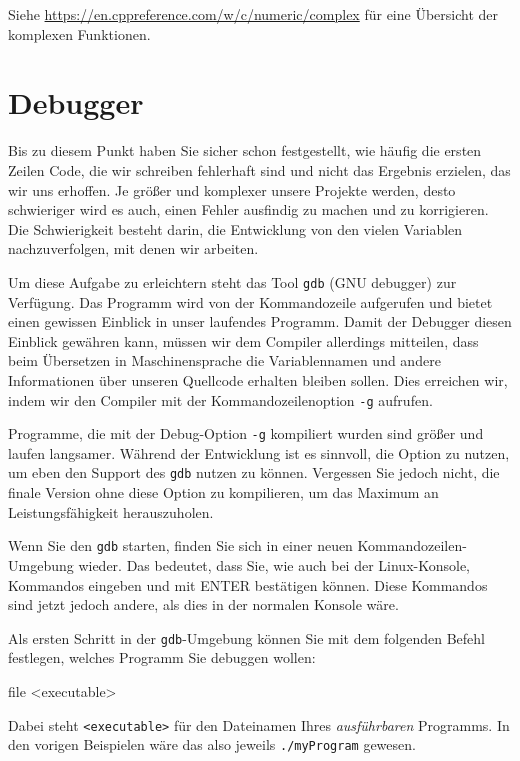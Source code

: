Siehe \url{https://en.cppreference.com/w/c/numeric/complex} für eine Übersicht der komplexen Funktionen.

\section{Debugger}
Bis zu diesem Punkt haben Sie sicher schon festgestellt, wie häufig die ersten Zeilen Code, die wir schreiben fehlerhaft sind und nicht das Ergebnis erzielen, das wir uns erhoffen. Je größer und komplexer unsere Projekte werden, desto schwieriger wird es auch, einen Fehler ausfindig zu machen und zu korrigieren. Die Schwierigkeit besteht darin, die Entwicklung von den vielen Variablen nachzuverfolgen, mit denen wir arbeiten.

Um diese Aufgabe zu erleichtern steht das Tool \texttt{gdb} (GNU debugger) zur Verfügung. Das Programm wird von der Kommandozeile aufgerufen und bietet einen gewissen Einblick in unser laufendes Programm. Damit der Debugger diesen Einblick gewähren kann, müssen wir dem Compiler allerdings mitteilen, dass beim Übersetzen in Maschinensprache die Variablennamen und andere Informationen über unseren Quellcode erhalten bleiben sollen. Dies erreichen wir, indem wir den Compiler mit der Kommandozeilenoption \texttt{-g} aufrufen.

\begin{hintbox}[Performanz]
Programme, die mit der Debug-Option \texttt{-g} kompiliert wurden sind größer und laufen langsamer. Während der Entwicklung ist es sinnvoll, die Option zu nutzen, um eben den Support des \texttt{gdb} nutzen zu können. Vergessen Sie jedoch nicht, die finale Version ohne diese Option zu kompilieren, um das Maximum an Leistungsfähigkeit herauszuholen.
\end{hintbox}

Wenn Sie den \texttt{gdb} starten, finden Sie sich in einer neuen Kommandozeilen-Umgebung wieder. Das bedeutet, dass Sie, wie auch bei der Linux-Konsole, Kommandos eingeben und mit ENTER bestätigen können. Diese Kommandos sind jetzt jedoch andere, als dies in der normalen Konsole wäre.

Als ersten Schritt in der \texttt{gdb}-Umgebung können Sie mit dem folgenden Befehl festlegen, welches Programm Sie debuggen wollen:
\begin{cmdbox}
file <executable>
\end{cmdbox}
Dabei steht \texttt{<executable>} für den Dateinamen Ihres \emph{ausführbaren} Programms. In den vorigen Beispielen wäre das also jeweils \texttt{./myProgram} gewesen.

